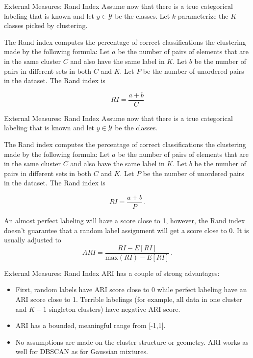 \documentclass[10pt, table, dvipsnames,xcdraw,handout]{beamer}
\newcommand{\cY}{\ensuremath{\mathcal{Y}}}
\begin{document}
\begin{frame}[fragile]{External Measures: Rand Index}
Assume now that there is a true categorical labeling that is known and let $y\in \cY$ be the classes. Let $k$ parameterize the $K$ classes picked by clustering. 

The Rand index computes the percentage of correct classifications the clustering made by the following formula: Let $a$ be the number of pairs of elements that are in the same cluster $C$ and also have the same label in $K$. Let $b$ be the number of pairs in different sets in both $C$ and $K$. Let $P$ be the number of unordered pairs in the dataset. The Rand index is

$$
RI = \frac{a+ b}{C}
$$
\end{frame}



\begin{frame}[fragile]{External Measures: Rand Index}
Assume now that there is a true categorical labeling that is known and let $y\in \cY$ be the classes. 

The Rand index computes the percentage of correct classifications the clustering made by the following formula: Let $a$ be the number of pairs of elements that are in the same cluster $C$ and also have the same label in $K$. Let $b$ be the number of pairs in different sets in both $C$ and $K$. Let $P$ be the number of unordered pairs in the dataset. The Rand index is

$$
RI = \frac{a+ b}{P}\,.
$$\pause

An almost perfect labeling will have a score close to 1, however, the Rand index doesn't guarantee that a random label assignment will get a score close to 0. It is usually adjusted to
$$
ARI = \frac{RI - E[RI]}{\text{max}(RI) - E[RI]}\,.
$$
\end{frame}





\begin{frame}[fragile]{External Measures: Rand Index}
ARI has a couple of strong advantages:

\begin{itemize}
\item First, random labels have ARI score close to 0 while perfect labeling have an ARI score close to 1. Terrible labelings (for example,  all data in one cluster and $K-1$ singleton clusters) have negative ARI score. 

\item ARI has a bounded, meaningful range from [-1,1].

\item No assumptions are made on the cluster structure or geometry. ARI works as well for DBSCAN as for Gaussian mixtures. 
\end{itemize}
\end{frame}
\end{document}
